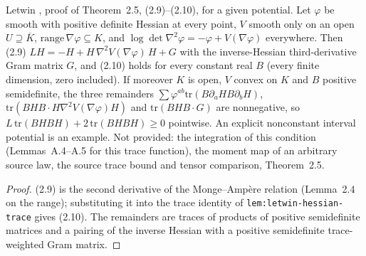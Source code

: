 \begin{lemma}
  \label{lem:letwin-ma-trace-210}
  \leanok
  Letwin \cite{Letwin2026QuadraticKLS}, proof of Theorem~2.5, (2.9)--(2.10), for a given potential.  Let $\varphi$ be smooth
  with positive definite Hessian at every point, $V$ smooth only on an open $U\supseteq\overline K$, $\mathrm{range}\,
  \nabla\varphi\subseteq K$, and $\log\det\nabla^2\varphi=-\varphi+V(\nabla\varphi)$ everywhere.  Then (2.9)
  $LH=-H+H\,\nabla^2V(\nabla\varphi)\,H+G$ with the inverse-Hessian third-derivative Gram matrix $G$, and (2.10) holds for every
  constant real $B$ (every finite dimension, zero included).  If moreover $K$ is open, $V$ convex on $K$ and $B$ positive
  semidefinite, the three remainders $\sum\varphi^{ab}\mathrm{tr}(B\partial_aHB\partial_bH)$,
  $\mathrm{tr}(BHB\cdot H\nabla^2V(\nabla\varphi)H)$ and $\mathrm{tr}(BHB\cdot G)$ are nonnegative, so
  $L\,\mathrm{tr}(BHBH)+2\,\mathrm{tr}(BHBH)\ge0$ pointwise.  An explicit nonconstant interval potential is an
  example.  Not provided: the integration of this condition (Lemmas~A.4--A.5 for this trace function), the moment map of an
  arbitrary source law, the source trace bound and tensor comparison, Theorem~2.5.
\end{lemma}
\begin{proof}
  \leanok
  (2.9) is the second derivative of the Monge--Amp\`ere relation (Lemma~2.4 on the range); substituting it into the trace
  identity of \texttt{lem:letwin-hessian-trace} gives (2.10).  The remainders are traces of products of positive semidefinite
  matrices and a pairing of the inverse Hessian with a positive semidefinite trace-weighted Gram matrix.
\end{proof}

